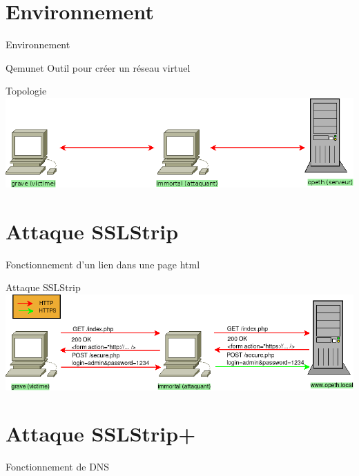 \documentclass{beamer}
\begin{document}
\section{Environnement}

\begin{frame}{Environnement}
    \begin{block}{Qemunet}
		Outil pour créer un réseau virtuel
    \end{block}
\end{frame}

\begin{frame}{Topologie}
    \includegraphics[scale=0.4]{../medias/topology.png}
\end{frame}

\section{Attaque SSLStrip}

\begin{frame}{Fonctionnement d'un lien dans une page html}

\end{frame}

\begin{frame}{Attaque SSLStrip}
    \includegraphics[scale=0.4]{../medias/sslstrip/attack.png}
\end{frame}

\section{Attaque SSLStrip+}

\begin{frame}{Fonctionnement de DNS}
\end{frame}
\end{document}
